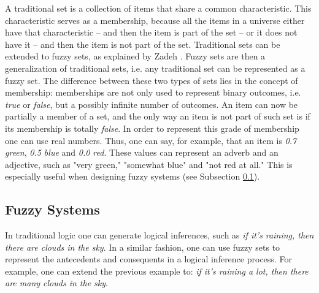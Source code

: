 A traditional set is a collection of items that share a common
characteristic. This characteristic serves as a membership, because all the
items in a universe either have that characteristic -- and then the item is part
of the set -- or it does not have it -- and then the item is not part of the
set. Traditional sets can be extended to fuzzy sets, as explained by Zadeh
\cite{Zadeh1965}. Fuzzy sets are then a generalization of traditional sets,
i.e. any traditional set can be represented as a fuzzy set. The difference
between these two types of sets lies in the concept of membership: memberships
are not only used to represent binary outcomes, i.e. \textit{true} or
\textit{false}, but a possibly infinite number of outcomes. An item can now be
partially a member of a set, and the only way an item is not part of such set is
if its membership is totally \textit{false}. In order to represent this grade of
membership one can use real numbers. Thus, one can say, for example, that an
item is \textit{0.7 green}, \textit{0.5 blue} and \textit{0.0 red}. These values
can represent an adverb and an adjective, such as "very green," "somewhat blue"
and "not red at all." This is especially useful when designing fuzzy systems
(see Subsection \ref{subsection:fuzzy-systems}).


\subsection{Fuzzy Systems}
\label{subsection:fuzzy-systems}

In traditional logic one can generate logical inferences, such as \textit{if
  it's raining, then there are clouds in the sky}. In a similar fashion, one can
use fuzzy sets to represent the antecedents and consequents in a logical
inference process. For example, one can extend the previous example to:
\textit{if it's raining a lot, then there are many clouds in the sky}.

